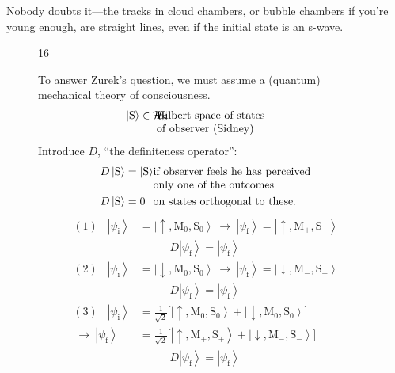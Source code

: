 \documentclass[12pt,nofootinbib]{revtex4}
\newcommand{\ket}[1]{\left|#1\right\rangle}
\renewcommand{\i}{\text{i}}
\newcommand{\f}{\text{f}}
\newcommand{\M}{\text{M}}
\renewcommand{\S}{\text{S}}
\newcommand{\up}{\uparrow}
\newcommand{\dw}{\downarrow}
\begin{document}
Nobody doubts it---the tracks in cloud chambers, or bubble chambers if you're young enough, are straight lines, even if the initial state is an s-wave.
\begin{figure}[htb] 
\begin{mdframed}
  \vspace{5pt}\hfill 16\\[-5pt] 
  \begin{raggedright}
    To answer Zurek's question, we must assume a (quantum) mechanical theory of consciousness.
    \begin{align}\nonumber
        &\hspace{-20pt}
          \ket{\S}\in \mathcal{H}_{\S}
          &&\hspace{-20pt}\text{Hilbert space of 
             states}\\[-3pt]\nonumber
        & &&\hspace{-20pt}\text{of observer (Sidney)}
    \end{align}
  Introduce $D$, ``the definiteness operator'':
  \begin{align}\nonumber
    &\hspace{0pt}
      D\ket{\S}=\ket{\S}
    &&\hspace{-10pt}\text{if observer feels he has 
       perceived}\\[-3pt]\nonumber
    & &&\hspace{-10pt}\text{only one of the
         outcomes}\\[0pt]\nonumber
    &\hspace{0pt}
      D\ket{\S}=0
    &&\hspace{-10pt}\text{on states orthogonal to these.}     
  \end{align}
  \begin{align}\nonumber
    (1)\hspace{10pt} \ket{\psi_\i}&=\ket{\up,\M_0,\S_0}\ \to \ 
             \ket{\psi_\f}=\ket{\up,\M_+,\S_+}\\[3pt]\nonumber
    &\hspace{33pt} D\ket{\psi_\f}=\ket{\psi_\f}\\[6pt]\nonumber
    (2)\hspace{10pt} \ket{\psi_\i}&=\ket{\dw,\M_0,\S_0}\ \to \ 
             \ket{\psi_\f}=\ket{\dw,\M_-,\S_-}\\[3pt]\nonumber
    &\hspace{33pt} D\ket{\psi_\f}=\ket{\psi_\f}\\[6pt]\nonumber
    (3)\hspace{10pt} \ket{\psi_\i}&=\frac{1}{\sqrt{2}}
    \bigl[\ket{\up,\M_0,\S_0}
                     +\ket{\dw,\M_0,\S_0}\bigr]
    \\[1pt]\nonumber
    \ \to\ \ket{\psi_\f}&=\frac{1}{\sqrt{2}}
    \bigl[\ket{\up,\M_+,\S_+}+\ket{\dw,\M_-,\S_-}\bigr]
    \\[3pt]\nonumber
    &\hspace{33pt} D\ket{\psi_\f}=\ket{\psi_\f}
  \end{align}
 \end{raggedright}
\vspace{-.75\baselineskip}
\end{mdframed}
\end{figure}
\end{document}
